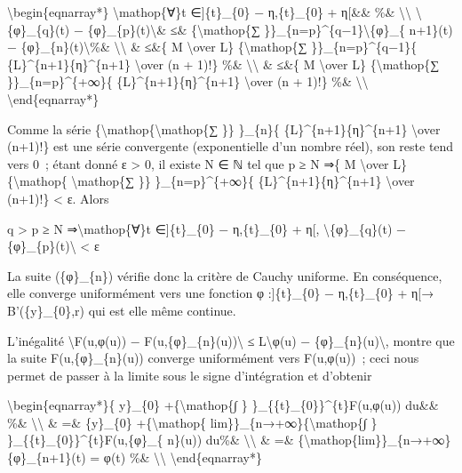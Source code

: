 \documentclass[]{article}
\begin{document}
\textbackslash{}begin\{eqnarray*\} \textbackslash{}mathop\{∀\}t
∈{]}\{t\}\_\{0\} − η,\{t\}\_\{0\} + η{[}\&\& \%\&
\textbackslash{}\textbackslash{}
\textbackslash{}\textbar{}\{φ\}\_\{q\}(t) −
\{φ\}\_\{p\}(t)\textbackslash{}\textbar{}\& ≤\&
\{\textbackslash{}mathop\{∑
\}\}\_\{n=p\}\^{}\{q−1\}\textbackslash{}\textbar{}\{φ\}\_\{ n+1\}(t) −
\{φ\}\_\{n\}(t)\textbackslash{}\textbar{}\%\&
\textbackslash{}\textbackslash{} \& ≤\&\{ M \textbackslash{}over L\}
\{\textbackslash{}mathop\{∑ \}\}\_\{n=p\}\^{}\{q−1\}\{
\{L\}\^{}\{n+1\}\{η\}\^{}\{n+1\} \textbackslash{}over (n + 1)!\} \%\&
\textbackslash{}\textbackslash{} \& ≤\&\{ M \textbackslash{}over L\}
\{\textbackslash{}mathop\{∑ \}\}\_\{n=p\}\^{}\{+∞\}\{
\{L\}\^{}\{n+1\}\{η\}\^{}\{n+1\} \textbackslash{}over (n + 1)!\} \%\&
\textbackslash{}\textbackslash{} \textbackslash{}end\{eqnarray*\}

Comme la série \{\textbackslash{}mathop\{\textbackslash{}mathop\{∑ \}\}
\}\_\{n\}\{ \{L\}\^{}\{n+1\}\{η\}\^{}\{n+1\} \textbackslash{}over
(n+1)!\} est une série convergente (exponentielle d'un nombre réel), son
reste tend vers 0~; étant donné ε \textgreater{} 0, il existe N ∈ ℕ tel
que p ≥ N ⇒\{ M \textbackslash{}over L\} \{\textbackslash{}mathop\{
\textbackslash{}mathop\{∑ \}\} \}\_\{n=p\}\^{}\{+∞\}\{
\{L\}\^{}\{n+1\}\{η\}\^{}\{n+1\} \textbackslash{}over (n+1)!\}
\textless{} ε. Alors

q \textgreater{} p ≥ N ⇒\textbackslash{}mathop\{∀\}t ∈{]}\{t\}\_\{0\} −
η,\{t\}\_\{0\} + η{[}, \textbackslash{}\textbar{}\{φ\}\_\{q\}(t) −
\{φ\}\_\{p\}(t)\textbackslash{}\textbar{} \textless{} ε

La suite (\{φ\}\_\{n\}) vérifie donc la critère de Cauchy uniforme. En
conséquence, elle converge uniformément vers une fonction φ
:{]}\{t\}\_\{0\} − η,\{t\}\_\{0\} + η{[}→ B'(\{y\}\_\{0\},r) qui est
elle même continue.

L'inégalité \textbackslash{}\textbar{}F(u,φ(u)) −
F(u,\{φ\}\_\{n\}(u))\textbackslash{}\textbar{} ≤
L\textbackslash{}\textbar{}φ(u) −
\{φ\}\_\{n\}(u)\textbackslash{}\textbar{}, montre que la suite
F(u,\{φ\}\_\{n\}(u)) converge uniformément vers F(u,φ(u))~; ceci nous
permet de passer à la limite sous le signe d'intégration et d'obtenir

\textbackslash{}begin\{eqnarray*\}\{ y\}\_\{0\}
+\{\textbackslash{}mathop\{∫ \} \}\_\{\{t\}\_\{0\}\}\^{}\{t\}F(u,φ(u))
du\&\& \%\& \textbackslash{}\textbackslash{} \& =\& \{y\}\_\{0\}
+\{\textbackslash{}mathop\{ lim\}\}\_\{n→+∞\}\{\textbackslash{}mathop\{∫
\} \}\_\{\{t\}\_\{0\}\}\^{}\{t\}F(u,\{φ\}\_\{ n\}(u)) du\%\&
\textbackslash{}\textbackslash{} \& =\&
\{\textbackslash{}mathop\{lim\}\}\_\{n→+∞\}\{φ\}\_\{n+1\}(t) = φ(t) \%\&
\textbackslash{}\textbackslash{} \textbackslash{}end\{eqnarray*\}
\end{document}
